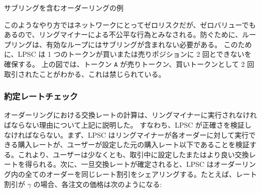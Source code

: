 \documentclass{article}
\makeatletter
\newenvironment{figurehere}
 {\def\@captype{figure}}
 {}
\makeatother
\begin{document}
\begin{multicols}{2}
\begin{center}
\begin{figurehere}

\caption{サブリングを含むオーダーリングの例}
\label{fig:subring}
\end{figurehere}
\end{center}

このようなやり方ではネットワークにとってゼロリスクだが、ゼロバリューでもあるので、リングマイナーによる不公平な行為とみなされる。防ぐために、ループリングは、有効なループにはサブリングが含まれない必要がある。 このために、LPSC は 1 つのトークンが買いまたは売りポジションに 2 回とできないを確保する。 上の図では、トークン \verb|A| が売りトークン、買いトークンとして 2 回取引されたことがわかる、これは禁じられている。

\subsubsection{約定レートチェック\label{sec:fill_rate_check}}
オーダーリングにおける交換レートの計算は、リングマイナーに実行されなければならない理由について上記に説明した。 すなわち、LPSC が正確さを検証しなければならない。まず、LPSC はリングマイナーが各オーダーに対して実行できる購入レートが、ユーザーが設定した元の購入レート以下であることを検証する。これより、ユーザーは少なくとも、取引中に設定したまたはより良い交換レートを得られる。次に、一旦交換レートが確定されると、LPSC はオーダーリング内の全てのオーダーを同じレート割引をシェアリングする。たとえば、レート割引が $\gamma$ の場合、各注文の価格は次のようになる:


\end{multicols}
\end{document}
